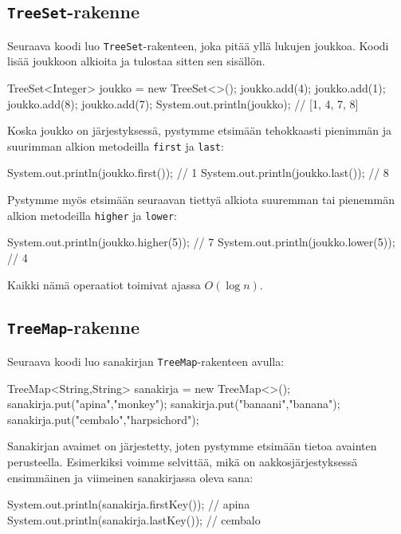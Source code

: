 \subsection{\texttt{TreeSet}-rakenne}

Seuraava koodi luo \texttt{TreeSet}-rakenteen,
joka pitää yllä lukujen joukkoa.
Koodi lisää joukkoon alkioita ja tulostaa sitten sen sisällön.

\begin{code}
TreeSet<Integer> joukko = new TreeSet<>();
joukko.add(4);
joukko.add(1);
joukko.add(8);
joukko.add(7);
System.out.println(joukko); // [1, 4, 7, 8]
\end{code}

Koska joukko on järjestyksessä, pystymme etsimään tehokkaasti
pienim\-män ja suurimman alkion metodeilla \texttt{first} ja \texttt{last}:

\begin{code}
System.out.println(joukko.first()); // 1
System.out.println(joukko.last()); // 8
\end{code}

Pystymme myös etsimään seuraavan tiettyä alkiota
suuremman tai pienemmän alkion metodeilla \texttt{higher} ja \texttt{lower}:

\begin{code}
System.out.println(joukko.higher(5)); // 7
System.out.println(joukko.lower(5)); // 4
\end{code}

Kaikki nämä operaatiot toimivat ajassa $O(\log n)$.

\subsection{\texttt{TreeMap}-rakenne}

Seuraava koodi luo sanakirjan \texttt{TreeMap}-rakenteen avulla:

\begin{code}
TreeMap<String,String> sanakirja = new TreeMap<>();
sanakirja.put("apina","monkey");
sanakirja.put("banaani","banana");
sanakirja.put("cembalo","harpsichord");
\end{code}

Sanakirjan avaimet on järjestetty,
joten pystymme etsimään tietoa avainten perusteella.
Esimerkiksi voimme selvittää, mikä on aakkosjärjestyksessä
ensimmäinen ja viimeinen sanakirjassa oleva sana:

\begin{code}
System.out.println(sanakirja.firstKey()); // apina
System.out.println(sanakirja.lastKey()); // cembalo
\end{code}

